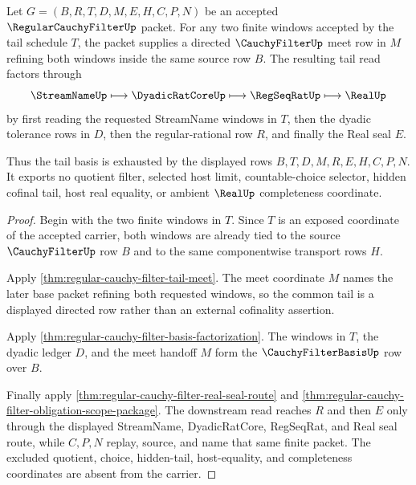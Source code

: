 \begin{theorem}
\label{thm:regular-cauchy-filter-tail-basis-exhaustion}
Let $G=(B,R,T,D,M,E,H,C,P,N)$ be an accepted $\RegularCauchyFilterUp$ packet. For any two finite windows accepted by the tail schedule $T$, the packet supplies a directed $\CauchyFilterUp$ meet row in $M$ refining both windows inside the same source row $B$. The resulting tail read factors through
$$
\StreamNameUp \longmapsto \DyadicRatCoreUp \longmapsto \RegSeqRatUp \longmapsto \RealUp
$$
by first reading the requested StreamName windows in $T$, then the dyadic tolerance rows in $D$, then the regular-rational row $R$, and finally the Real seal $E$.

Thus the tail basis is exhausted by the displayed rows $B,T,D,M,R,E,H,C,P,N$. It exports no quotient filter, selected host limit, countable-choice selector, hidden cofinal tail, host real equality, or ambient $\RealUp$ completeness coordinate.
\end{theorem}
\begin{proof}
Begin with the two finite windows in $T$. Since $T$ is an exposed coordinate of the accepted carrier, both windows are already tied to the source $\CauchyFilterUp$ row $B$ and to the same componentwise transport rows $H$.

Apply \autoref{thm:regular-cauchy-filter-tail-meet}. The meet coordinate $M$ names the later base packet refining both requested windows, so the common tail is a displayed directed row rather than an external cofinality assertion.

Apply \autoref{thm:regular-cauchy-filter-basis-factorization}. The windows in $T$, the dyadic ledger $D$, and the meet handoff $M$ form the $\CauchyFilterBasisUp$ row over $B$.

Finally apply \autoref{thm:regular-cauchy-filter-real-seal-route} and \autoref{thm:regular-cauchy-filter-obligation-scope-package}. The downstream read reaches $R$ and then $E$ only through the displayed StreamName, DyadicRatCore, RegSeqRat, and Real seal route, while $C,P,N$ replay, source, and name that same finite packet. The excluded quotient, choice, hidden-tail, host-equality, and completeness coordinates are absent from the carrier.
\end{proof}

